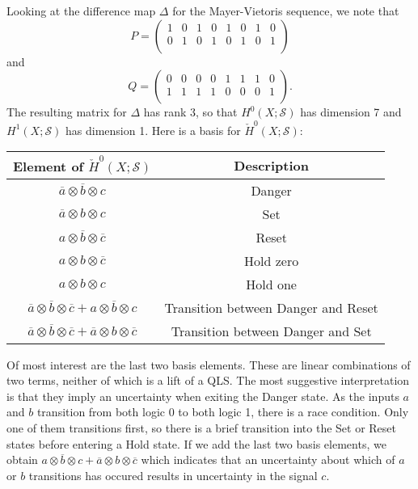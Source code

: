 \documentclass{amsart}
\theoremstyle{plain}
\theoremstyle{definition}
\begin{document}
Looking at the difference map $\Delta$ for the Mayer-Vietoris sequence, we note that
\begin{equation*}
P=\begin{pmatrix}
1&0&1&0 & 1&0&1&0\\
0&1&0&1 & 0&1&0&1\\
\end{pmatrix}
\end{equation*}
and
\begin{equation*}
Q=\begin{pmatrix}
0&0&0&0 & 1&1&1&0\\
1&1&1&1 & 0&0&0&1\\
\end{pmatrix}.
\end{equation*}  
The resulting matrix for $\Delta$ has rank 3, so that $H^0(X;\mathcal{S})$ has dimension 7 and $H^1(X;\mathcal{S})$ has dimension 1.  Here is a basis for $\check{H}^0(X;\mathcal{S})$:
\begin{center}
\begin{tabular}{c|c}
Element of $\check{H}^0(X;\mathcal{S})$&Description\\
\hline
$\overline{a}\otimes\overline{b}\otimes c$&Danger\\
$\overline{a}\otimes b \otimes c$&Set\\
$a\otimes \overline{b}\otimes \overline{c}$&Reset\\
$a\otimes b\otimes\overline{c}$&Hold zero\\
$a\otimes b\otimes c$&Hold one\\
$\overline{a}\otimes\overline{b}\otimes\overline{c}+a\otimes\overline{b}\otimes c$&Transition between Danger and Reset\\
$\overline{a}\otimes\overline{b}\otimes\overline{c}+\overline{a}\otimes b\otimes\overline{c}$&Transition between Danger and Set\\
\end{tabular}
\end{center}
Of most interest are the last two basis elements.  These are linear
combinations of two terms, neither of which is a lift of a QLS.  The
most suggestive interpretation is that they imply an uncertainty when
exiting the Danger state.  As the inputs $a$ and $b$ transition from
both logic 0 to both logic 1, there is a race condition.  Only one of
them transitions first, so there is a brief transition into
the Set or Reset states before entering a Hold state.  If we add the
last two basis elements, we obtain $a\otimes\overline{b}\otimes
c+\overline{a}\otimes b\otimes\overline{c}$ which indicates that an
uncertainty about which of $a$ or $b$ transitions has occured results
in uncertainty in the signal $c$.
\end{document}
